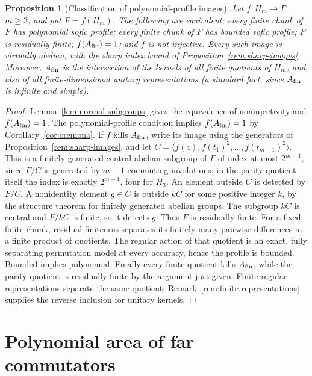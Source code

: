 \documentclass[11pt,a4paper]{article}
\theoremstyle{plain}
\newtheorem{proposition}[theorem]{Proposition}
\theoremstyle{definition}
\theoremstyle{remark}
\begin{document}
\begin{proposition}[Classification of polynomial-profile images]\label{prop:image-classification}
Let $f:H_m\to\Gamma$, $m\ge3$, and put $F=f(H_m)$. The following are equivalent:
every finite chunk of $F$ has polynomial sofic profile; every finite chunk of $F$ has bounded sofic profile;
$F$ is residually finite; $f(A_{\rm fin})=1$; and $f$ is not injective.
Every such image is virtually abelian, with the sharp index bound of Proposition~\ref{rem:sharp-images}.
Moreover, $A_{\rm fin}$ is the intersection of the kernels of all finite quotients of $H_m$, and also of all finite-dimensional unitary
representations (a standard fact, since $A_{\rm fin}$ is infinite and simple).
\end{proposition}
\begin{proof}
Lemma~\ref{lem:normal-subgroups} gives the equivalence of noninjectivity and $f(A_{\rm fin})=1$.
The polynomial-profile condition implies $f(A_{\rm fin})=1$ by Corollary~\ref{cor:cremona}.
If $f$ kills $A_{\rm fin}$, write its image using the generators of Proposition~\ref{rem:sharp-images}, and let
$C=\langle f(z),f(t_1)^2,\ldots,f(t_{m-1})^2\rangle$. This is a finitely generated central abelian subgroup of $F$ of index at most $2^{m-1}$, since $F/C$ is generated by $m-1$
commuting involutions; in the parity quotient itself the index is exactly $2^{m-1}$, four for $H_3$.
An element outside $C$ is detected by $F/C$. A nonidentity element $g\in C$ is outside $kC$ for some positive integer $k$, by the structure
theorem for finitely generated abelian groups. The subgroup $kC$ is central and $F/kC$ is finite, so it detects $g$. Thus $F$ is residually finite.
For a fixed finite chunk, residual finiteness separates its finitely many pairwise differences in a finite product of quotients.
The regular action of that quotient is an exact, fully separating permutation model at every accuracy, hence the profile is bounded.
Bounded implies polynomial. Finally every finite quotient kills $A_{\rm fin}$, while the parity quotient is residually finite by the argument
just given. Finite regular representations separate the same quotient; Remark~\ref{rem:finite-representations} supplies the reverse inclusion
for unitary kernels.
\end{proof}

\section{Polynomial area of far commutators}\label{sec:area}
\end{document}
